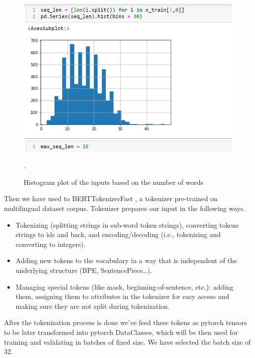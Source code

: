 \documentclass[a4paper, 12pt]{article}
\begin{document}
\begin{sloppypar}
 \begin{figure}[H]
 \begin{center}
 \includegraphics[scale=0.65]{maxlen.png}
 \caption{Histogram plot of the inputs based on the number of words\label{plot}}.
 \end{center}
 \end{figure}
 Then we have used to BERTTokenizerFast , a tokenizer pre-trained on multilingual dataset corpus. Tokenizer prepares our input in the following ways.
 \begin{itemize}
 \item{Tokenizing (splitting strings in sub-word token strings), converting tokens strings to ids and back, and encoding/decoding (i.e., tokenizing and converting to integers).}\cite{noauthor_tokenizer_nodate}

\item{Adding new tokens to the vocabulary in a way that is independent of the underlying structure (BPE, SentencePiece…).}\cite{noauthor_tokenizer_nodate}

\item{Managing special tokens (like mask, beginning-of-sentence, etc.): adding them, assigning them to attributes in the tokenizer for easy access and making sure they are not split during tokenization.}\cite{noauthor_tokenizer_nodate}
 \end{itemize}
 
 After the tokenization process is done we've feed these tokens as pytorch\cite{noauthor_pytorch_nodate}
  tensors to be later transformed into pytorch DataClasses, which will be then used for training and validating in batches of fixed size. We have selected the batch size of 32.
  

\end{sloppypar}
\end{document}
